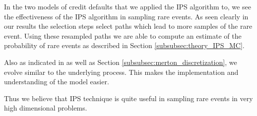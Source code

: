 In the two models of credit defaults that we applied the IPS algorithm to,  we
see the effectiveness of the IPS algorithm in sampling rare events. As seen
clearly in our results the selection steps select paths which lead to more
samples of the rare event. Using these resampled paths we are able to compute
an estimate of the probability of rare events as described in Section
\ref{subsubsec:theory_IPS_MC}.

Also as indicated in \cite{CarmonaIPS} as well as Section
\ref{subsubsec:merton_discretization}, we evolve similar to the underlying 
process. This makes the implementation and understanding of the model easier.

Thus we believe that IPS technique is quite useful in sampling rare events in 
very high dimensional problems.
